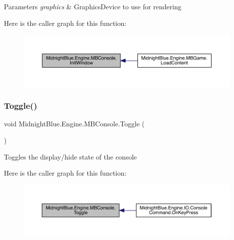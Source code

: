 \begin{DoxyParams}{Parameters}
{\em graphics} & Graphics\+Device to use for rendering\\
\hline
\end{DoxyParams}
Here is the caller graph for this function\+:
\nopagebreak
\begin{figure}[H]
\begin{center}
\leavevmode
\includegraphics[width=350pt]{class_midnight_blue_1_1_engine_1_1_m_b_console_a08a6230b8a61577552243f30fa3b07a2_icgraph}
\end{center}
\end{figure}
\hypertarget{class_midnight_blue_1_1_engine_1_1_m_b_console_a502833c7c57a512688da2e7771401df8}{}\label{class_midnight_blue_1_1_engine_1_1_m_b_console_a502833c7c57a512688da2e7771401df8} 
\subsubsection{\texorpdfstring{Toggle()}{Toggle()}}
{\footnotesize\ttfamily void Midnight\+Blue.\+Engine.\+M\+B\+Console.\+Toggle (\begin{DoxyParamCaption}{ }\end{DoxyParamCaption})\hspace{0.3cm}{\ttfamily [inline]}}



Toggles the display/hide state of the console 

Here is the caller graph for this function\+:
\nopagebreak
\begin{figure}[H]
\begin{center}
\leavevmode
\includegraphics[width=350pt]{class_midnight_blue_1_1_engine_1_1_m_b_console_a502833c7c57a512688da2e7771401df8_icgraph}
\end{center}
\end{figure}
\hypertarget{class_midnight_blue_1_1_engine_1_1_m_b_console_a94e6b48373f8dda4137ad79ecea8a40d}{}\label{class_midnight_blue_1_1_engine_1_1_m_b_console_a94e6b48373f8dda4137ad79ecea8a40d} 
